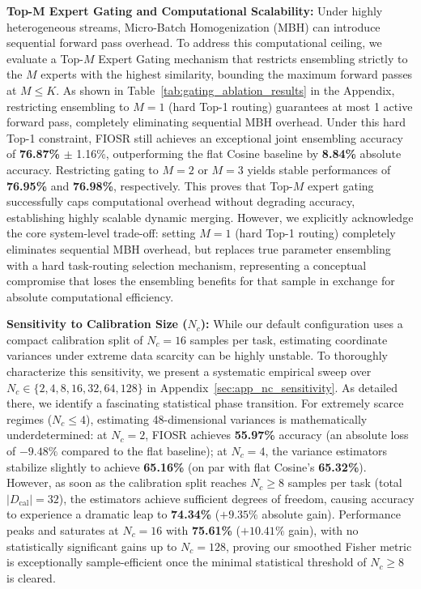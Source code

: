 \textbf{Top-M Expert Gating and Computational Scalability:}
Under highly heterogeneous streams, Micro-Batch Homogenization (MBH) can introduce sequential forward pass overhead. To address this computational ceiling, we evaluate a Top-$M$ Expert Gating mechanism that restricts ensembling strictly to the $M$ experts with the highest similarity, bounding the maximum forward passes at $M \le K$. As shown in Table~\ref{tab:gating_ablation_results} in the Appendix, restricting ensembling to $M=1$ (hard Top-1 routing) guarantees at most 1 active forward pass, completely eliminating sequential MBH overhead. Under this hard Top-1 constraint, FIOSR still achieves an exceptional joint ensembling accuracy of \textbf{76.87\%} $\pm$ 1.16\%, outperforming the flat Cosine baseline by \textbf{8.84\%} absolute accuracy. Restricting gating to $M=2$ or $M=3$ yields stable performances of \textbf{76.95\%} and \textbf{76.98\%}, respectively. This proves that Top-$M$ expert gating successfully caps computational overhead without degrading accuracy, establishing highly scalable dynamic merging. However, we explicitly acknowledge the core system-level trade-off: setting $M=1$ (hard Top-1 routing) completely eliminates sequential MBH overhead, but replaces true parameter ensembling with a hard task-routing selection mechanism, representing a conceptual compromise that loses the ensembling benefits for that sample in exchange for absolute computational efficiency.

\textbf{Sensitivity to Calibration Size ($N_c$):}
While our default configuration uses a compact calibration split of $N_c=16$ samples per task, estimating coordinate variances under extreme data scarcity can be highly unstable. To thoroughly characterize this sensitivity, we present a systematic empirical sweep over $N_c \in \{2, 4, 8, 16, 32, 64, 128\}$ in Appendix~\ref{sec:app_nc_sensitivity}. As detailed there, we identify a fascinating statistical phase transition. For extremely scarce regimes ($N_c \le 4$), estimating 48-dimensional variances is mathematically underdetermined: at $N_c=2$, FIOSR achieves \textbf{55.97\%} accuracy (an absolute loss of $-9.48\%$ compared to the flat baseline); at $N_c=4$, the variance estimators stabilize slightly to achieve \textbf{65.16\%} (on par with flat Cosine's \textbf{65.32\%}). However, as soon as the calibration split reaches $N_c \ge 8$ samples per task (total $|D_{\text{cal}}| = 32$), the estimators achieve sufficient degrees of freedom, causing accuracy to experience a dramatic leap to \textbf{74.34\%} ($+9.35\%$ absolute gain). Performance peaks and saturates at $N_c=16$ with \textbf{75.61\%} ($+10.41\%$ gain), with no statistically significant gains up to $N_c=128$, proving our smoothed Fisher metric is exceptionally sample-efficient once the minimal statistical threshold of $N_c \ge 8$ is cleared.

